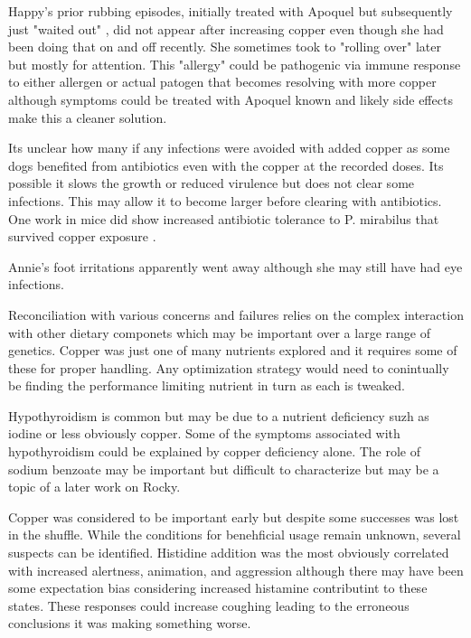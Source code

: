 Happy's prior rubbing episodes, initially treated with Apoquel but 
subsequently just "waited out" , did not appear
after increasing copper even though she had been doing that on and
off recently.
She sometimes took to "rolling over" later but mostly for attention. 
 This "allergy" could be  pathogenic via 
immune response to either allergen or actual patogen 
that becomes resolving with more copper although symptoms
could be treated with Apoquel known and likely side effects
make this a cleaner solution. 

Its unclear how many if any infections were avoided with
added copper as some dogs benefited from antibiotics even with
the copper at the recorded doses. Its possible it slows the growth
or reduced virulence but does not clear some infections.
This may allow it to become larger before clearing with antibiotics.
One work in mice did show increased antibiotic tolerance to
P. mirabilus that survived copper exposure
\cite{Huang_Lee_Wang_Copper_affects_virulence_2024}.

Annie's foot irritations apparently went away although she may
still have had eye infections.  


Reconciliation with various concerns and failures
relies on the complex interaction with other dietary componets
which may be important over a large range of genetics. 
Copper was just one of many nutrients explored and
it requires some of these for proper handling.
Any optimization strategy would need to conintually
be finding the performance limiting nutrient
in turn as each is tweaked. 


Hypothyroidism is common but may be due to a nutrient
deficiency suzh as iodine or less obviously copper.
Some of the symptoms associated with hypothyroidism
could be explained by copper deficiency alone.
The role of sodium benzoate may be important but
difficult to characterize  but may be a topic of a later
work on Rocky.

Copper was considered to be important early but despite
some successes was lost in the shuffle. While the conditions
for benehficial usage remain unknown, several suspects
can be identified. Histidine addition was the most
obviously correlated with increased
alertness, animation, and aggression although there
may have been some expectation bias considering increased
histamine contributint to these states. These responses
could increase coughing leading to the erroneous
conclusions it was making something worse.    

